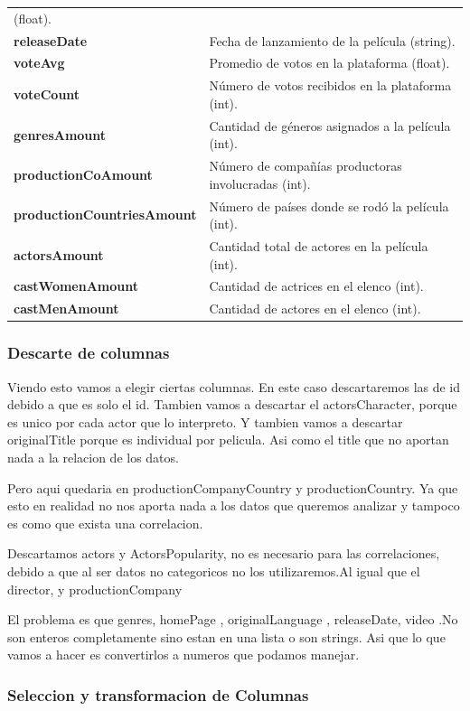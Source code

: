 \documentclass[
]{article}
\begin{document}
\begin{longtable}[]{@{}
  >{\raggedright\arraybackslash}p{}
  >{\raggedright\arraybackslash}p{}@{}}
(float). \\
\textbf{releaseDate} & Fecha de lanzamiento de la película (string). \\
\textbf{voteAvg} & Promedio de votos en la plataforma (float). \\
\textbf{voteCount} & Número de votos recibidos en la plataforma
(int). \\
\textbf{genresAmount} & Cantidad de géneros asignados a la película
(int). \\
\textbf{productionCoAmount} & Número de compañías productoras
involucradas (int). \\
\textbf{productionCountriesAmount} & Número de países donde se rodó la
película (int). \\
\textbf{actorsAmount} & Cantidad total de actores en la película
(int). \\
\textbf{castWomenAmount} & Cantidad de actrices en el elenco (int). \\
\textbf{castMenAmount} & Cantidad de actores en el elenco (int). \\
\end{longtable}

\subsubsection{Descarte de columnas}\label{descarte-de-columnas}

Viendo esto vamos a elegir ciertas columnas. En este caso descartaremos
las de id debido a que es solo el id. Tambien vamos a descartar el
actorsCharacter, porque es unico por cada actor que lo interpreto. Y
tambien vamos a descartar originalTitle porque es individual por
pelicula. Asi como el title que no aportan nada a la relacion de los
datos.

Pero aqui quedaria en productionCompanyCountry y productionCountry. Ya
que esto en realidad no nos aporta nada a los datos que queremos
analizar y tampoco es como que exista una correlacion.

Descartamos actors y ActorsPopularity, no es necesario para las
correlaciones, debido a que al ser datos no categoricos no los
utilizaremos.Al igual que el director, y productionCompany

El problema es que genres, homePage , originalLanguage , releaseDate,
video .No son enteros completamente sino estan en una lista o son
strings. Asi que lo que vamos a hacer es convertirlos a numeros que
podamos manejar.

\subsubsection{Seleccion y transformacion de
Columnas}\label{seleccion-y-transformacion-de-columnas}
\end{document}
